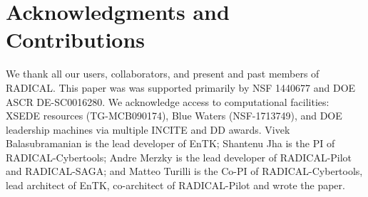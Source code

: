 \documentclass[preprint,12pt, a4paper]{elsarticle}
\begin{document}


\section*{Acknowledgments and Contributions}

We thank all our users, collaborators, and present and past members of
RADICAL\@. This paper was was supported primarily by NSF 1440677 and DOE ASCR
{DE-SC0016280}. We acknowledge access to computational facilities: XSEDE
resources (TG-MCB090174), Blue Waters (NSF-1713749), and DOE leadership
machines via multiple INCITE and DD awards. Vivek Balasubramanian is the lead
developer of EnTK\@; Shantenu Jha is the PI of RADICAL-Cybertools; Andre
Merzky is the lead developer of RADICAL-Pilot and RADICAL-SAGA\@; and Matteo
Turilli is the Co-PI of RADICAL-Cybertools, lead architect of EnTK,
co-architect of RADICAL-Pilot and wrote the paper.

 



\appendix
\end{document}

